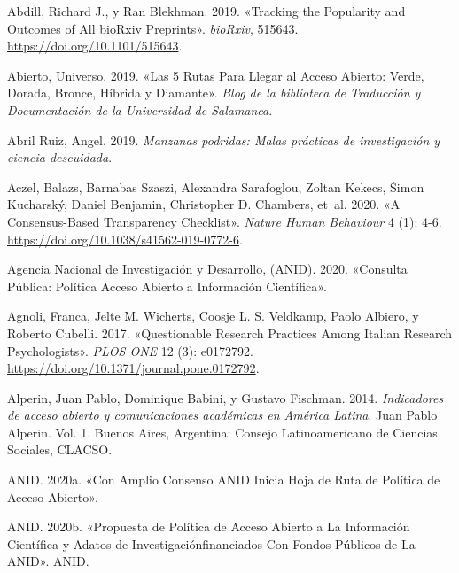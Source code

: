 \documentclass[
  spanish,
  letterpaper,
  DIV=11,
  numbers=noendperiod]{scrreprt}
\newlength{\cslhangindent}
\newenvironment{CSLReferences}[2] %
 {\begin{list}{}{%
  \setlength{\itemindent}{0pt}
  \setlength{\leftmargin}{0pt}
  \setlength{\parsep}{0pt}
  \ifodd #1
   \setlength{\leftmargin}{\cslhangindent}
   \setlength{\itemindent}{-1\cslhangindent}
  \fi
  \setlength{\itemsep}{#2\baselineskip}}}
 {\end{list}}
\begin{document}
\label{refs}
\begin{CSLReferences}{1}{0}
Abdill, Richard J., y Ran Blekhman. 2019. {«Tracking the Popularity and
Outcomes of All {bioRxiv} Preprints»}. \emph{bioRxiv}, 515643.
\url{https://doi.org/10.1101/515643}.

Abierto, Universo. 2019. {«Las 5 Rutas Para Llegar al Acceso Abierto:
Verde, Dorada, Bronce, H{í}brida y Diamante»}. \emph{Blog de la
biblioteca de Traducci{ó}n y Documentaci{ó}n de la Universidad de
Salamanca}.

Abril Ruiz, Angel. 2019. \emph{{Manzanas podridas: Malas pr{á}cticas de
investigaci{ó}n y ciencia descuidada}}.

Aczel, Balazs, Barnabas Szaszi, Alexandra Sarafoglou, Zoltan Kekecs,
Šimon Kucharský, Daniel Benjamin, Christopher D. Chambers, et~al. 2020.
{«A Consensus-Based Transparency Checklist»}. \emph{Nature Human
Behaviour} 4 (1): 4-6. \url{https://doi.org/10.1038/s41562-019-0772-6}.

Agencia Nacional de Investigación y Desarrollo, (ANID). 2020. {«Consulta
{P{ú}blica}: {Pol{í}tica Acceso Abierto} a {Informaci{ó}n
Cient{í}fica}»}.

Agnoli, Franca, Jelte M. Wicherts, Coosje L. S. Veldkamp, Paolo Albiero,
y Roberto Cubelli. 2017. {«Questionable Research Practices Among Italian
Research Psychologists»}. \emph{PLOS ONE} 12 (3): e0172792.
\url{https://doi.org/10.1371/journal.pone.0172792}.

Alperin, Juan Pablo, Dominique Babini, y Gustavo Fischman. 2014.
\emph{{Indicadores de acceso abierto y comunicaciones acad{é}micas en
Am{é}rica Latina}}. Juan Pablo Alperin. Vol. 1. Buenos Aires, Argentina:
Consejo Latinoamericano de Ciencias Sociales, CLACSO.

ANID. 2020a. {«Con {Amplio Consenso ANID Inicia Hoja} de {Ruta} de
{Pol{í}tica} de {Acceso Abierto}»}.

ANID. 2020b. {«Propuesta de {Pol{í}tica} de Acceso Abierto a La
Informaci{ó}n Cient{í}fica y Adatos de Investigaci{ó}nfinanciados Con
Fondos P{ú}blicos de La {ANID}»}. ANID.


\end{CSLReferences}
\end{document}

